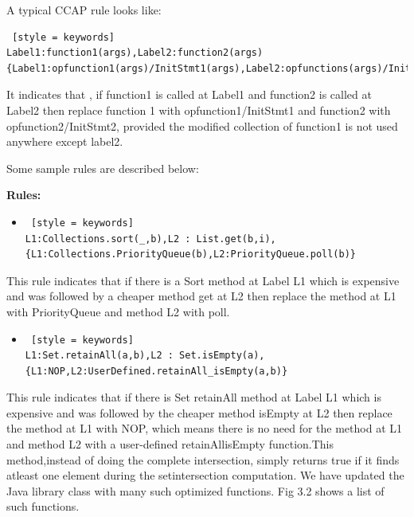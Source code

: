 A typical CCAP rule looks like:
\begin{lstlisting} [style = keywords]
Label1:function1(args),Label2:function2(args) {Label1:opfunction1(args)/InitStmt1(args),Label2:opfunctions(args)/InitStmt2(args)} 
\end{lstlisting}

It indicates that , if function1 is called at Label1 and function2 is called at Label2 then replace function 1 with opfunction1/InitStmt1 and function2 with opfunction2/InitStmt2, provided the modified collection of function1 is not used anywhere except label2.

Some sample rules are described below:

\textbf{\small Rules:}

\begin{itemize} [leftmargin=0.5cm]
\item \begin{lstlisting} [style = keywords]
L1:Collections.sort(_,b),L2 : List.get(b,i),{L1:Collections.PriorityQueue(b),L2:PriorityQueue.poll(b)}
\end{lstlisting}
\end{itemize} 

This rule indicates that if there is a Sort method at Label L1 which is expensive and was followed by a cheaper method get at L2 then replace the method at L1 with PriorityQueue and method L2 with poll.\\

\begin{itemize} [leftmargin=0.5cm]
\item \begin{lstlisting} [style = keywords]
L1:Set.retainAll(a,b),L2 : Set.isEmpty(a),{L1:NOP,L2:UserDefined.retainAll_isEmpty(a,b)} 
\end{lstlisting}
\end{itemize}

This rule indicates that if there is Set retainAll method at Label L1 which is expensive and was followed by the cheaper method isEmpty at L2 then replace the method at L1 with NOP, which means there is no need for the method at L1 and method L2 with a user-defined retainAll\textunderscore isEmpty function.This method,instead of doing the complete intersection, simply returns true if it finds atleast one element during the set\textunderscore intersection computation. We have updated the Java library class with many such optimized functions. Fig 3.2 shows a list of such functions.\\

